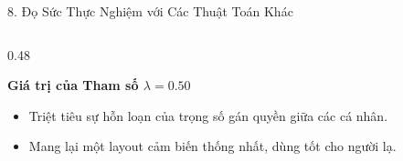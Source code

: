 \documentclass[aspectratio=169,10pt]{beamer}
\begin{document}
\begin{frame}{8. Đọ Sức Thực Nghiệm với Các Thuật Toán Khác}
\begin{columns}[T,onlytextwidth]
        \begin{column}{0.48\textwidth}
            \begin{exampleblock}{\textbf{Giá trị của Tham số $\lambda = 0.50$}}
                \scriptsize
                \begin{itemize}
                    \item Triệt tiêu sự hỗn loạn của trọng số gán quyền giữa các cá nhân.
                    \item Mang lại một layout cảm biến thống nhất, dùng tốt cho người lạ.
                \end{itemize}
            \end{exampleblock}
        \end{column}
    \end{columns}
\end{frame}
\end{document}
